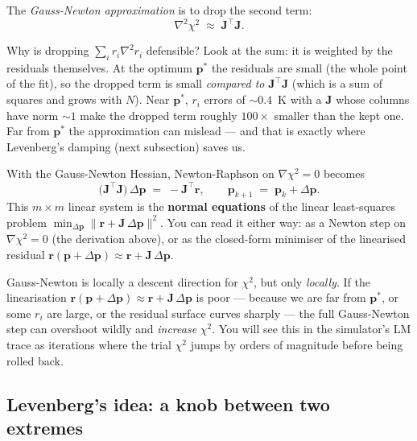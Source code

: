 \documentclass[11pt,a4paper]{article}
\newcommand{\Jac}{\mathbf{J}}
\newcommand{\pv}{\mathbf{p}}                          %
\newcommand{\rv}{\mathbf{r}}                          %
\begin{document}
The \emph{Gauss-Newton approximation} is to drop the second term:
\begin{equation}
   \nabla^2 \chi^2 \;\approx\; \Jac^{\!\top}\Jac.
\end{equation}

\begin{intuition}
Why is dropping $\sum_i r_i \nabla^2 r_i$ defensible? Look at the
sum: it is weighted by the residuals themselves. At the optimum
$\pv^*$ the residuals are small (the whole point of the fit), so
the dropped term is small \emph{compared to} $\Jac^{\!\top}\Jac$
(which is a sum of squares and grows with $N$). Near $\pv^*$,
$r_i$ errors of $\sim 0.4$~K with a $\Jac$ whose columns have norm
$\sim 1$ make the dropped term roughly $100\times$ smaller than the
kept one. Far from $\pv^*$ the approximation can mislead --- and
that is exactly where Levenberg's damping (next subsection) saves
us.
\end{intuition}

With the Gauss-Newton Hessian, Newton-Raphson on
$\nabla\chi^2 = 0$ becomes
\begin{equation}
   \bigl(\Jac^{\!\top}\Jac\bigr)\,\Delta\pv \;=\; -\Jac^{\!\top}\rv,
   \qquad \pv_{k+1} \;=\; \pv_k + \Delta\pv.
   \label{eq:normal-eq}
\end{equation}
This $m\times m$ linear system is the \textbf{normal equations} of
the linear least-squares problem
$\min_{\Delta\pv}\|\rv + \Jac\,\Delta\pv\|^2$. You can read it
either way: as a Newton step on $\nabla\chi^2 = 0$ (the derivation
above), or as the closed-form minimiser of the linearised residual
$\rv(\pv + \Delta\pv) \approx \rv + \Jac\,\Delta\pv$.

\begin{pitfall}
Gauss-Newton is locally a descent direction for $\chi^2$, but only
\emph{locally}. If the linearisation $\rv(\pv + \Delta\pv) \approx
\rv + \Jac\,\Delta\pv$ is poor --- because we are far from
$\pv^*$, or some $r_i$ are large, or the residual surface curves
sharply --- the full Gauss-Newton step can overshoot wildly and
\emph{increase} $\chi^2$. You will see this in the simulator's LM
trace as iterations where the trial $\chi^2$ jumps by orders of
magnitude before being rolled back.
\end{pitfall}

\subsection{Levenberg's idea: a knob between two extremes}
\end{document}
